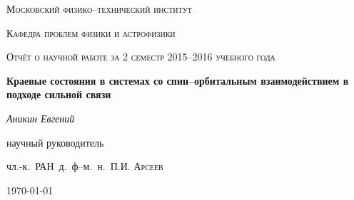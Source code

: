 \begin{titlepage}
	\centering
	{\scshape\LARGE Московский физико--технический институт\par}
	{\scshape Кафедра проблем физики и астрофизики \par}
	\vspace{1cm}
	{\scshape\Large Отчёт о научной работе за 2 семестр 2015--2016 учебного года\par}
	\vspace{1.5cm}
	{\huge\bfseries Краевые состояния в системах со спин--орбитальным взаимодействием
		в подходе сильной связи\par}
	\vspace{2cm}
	{\Large\itshape Аникин Евгений\par}
	\vfill
	научный руководитель\par
	чл.-к.~РАН~д.~ф--м.~н.~П.И. \textsc{Арсеев}

	\vfill

	{\large \today\par}
\end{titlepage}
